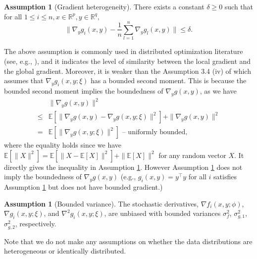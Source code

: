 \documentclass{article}
\theoremstyle{plain}
\theoremstyle{definition}
\newtheorem{assumption}[theorem]{Assumption}
\theoremstyle{remark}
\newcommand{\R}{\mathbb{R}}
\newcommand{\E}{\mathbb{E}}
\begin{document}
\begin{assumption}[Gradient heterogeneity]\label{assump: similarity_of_g}
    There exists a constant $\delta \geq 0$ such that for all $1\leq i\leq n, x\in\R^p, y\in \R^q,$
    \[
        \|\nabla_yg_i(x,y) - \frac{1}{n}\sum_{l=1}^{n}\nabla_y g_l(x,y)\| \leq \delta.
    \]
\end{assumption}
The above assumption is commonly used in distributed optimization literature (see, e.g., \citet{lian2017can}), and it indicates the level of  similarity between the local gradient and the global gradient. Moreover, it is weaker than the Assumption 3.4 (iv) of \citet{yang2022decentralized} which assumes that $\nabla_yg_i(x,y;\xi)$ has a bounded second moment. This is because the bounded second moment implies the boundedness of $\nabla_yg(x,y)$, as we have
\begin{align*}
    &\|\nabla_yg(x,y)\|^2 \\
    \leq &\E\left[\|\nabla_yg(x,y) - \nabla_yg(x,y;\xi)\|^2\right] + \|\nabla_yg(x,y)\|^2 \\
    = &\E\left[\|\nabla_yg(x,y;\xi)\|^2\right] \text{ -- uniformly bounded,}
\end{align*}
where the equality holds since we have $\E\left[\|X\|^2\right] = \E\left[\|X-\E\left[X\right]\|^2\right] + \|\E\left[X\right]\|^2$ for any random vector $X$. 
It directly gives the inequality in Assumption \ref{assump: similarity_of_g}. However Assumption \ref{assump: similarity_of_g} does not imply the boundedness of $\nabla_yg(x,y)$ (e.g., $g_i(x,y) = y^{\top}y$ for all $i$ satisfies Assumption \ref{assump: similarity_of_g} but does not have bounded gradient.)
\begin{assumption}[Bounded variance]\label{assump: stoc_derivatives}
     The stochastic derivatives, $\nabla f_i(x,y;\phi)$, $\nabla g_i(x,y;\xi)$, and $\nabla^2 g_i(x,y;\xi)$, are unbiased with bounded variances $\sigma_f^2$, $\sigma_{g,1}^2$, $\sigma_{g,2}^2$, respectively.
\end{assumption}
Note that we do not make any assumptions on whether the data distributions are heterogeneous or identically distributed.
\end{document}
